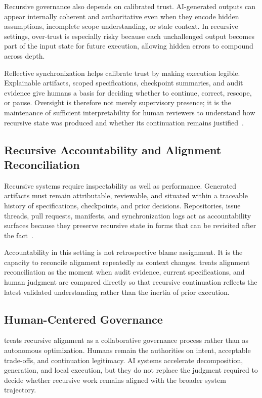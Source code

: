 Recursive governance also depends on calibrated trust. AI-generated outputs can appear internally coherent and authoritative even when they encode hidden assumptions, incomplete scope understanding, or stale context. In recursive settings, over-trust is especially risky because each unchallenged output becomes part of the input state for future execution, allowing hidden errors to compound across depth.

Reflective synchronization helps calibrate trust by making execution legible. Explainable artifacts, scoped specifications, checkpoint summaries, and audit evidence give humans a basis for deciding whether to continue, correct, rescope, or pause. Oversight is therefore not merely supervisory presence; it is the maintenance of sufficient interpretability for human reviewers to understand how recursive state was produced and whether its continuation remains justified~\cite{Amershi2014InteractiveML,Shneiderman2020HCAI}.

\subsection{Recursive Accountability and Alignment Reconciliation}

Recursive systems require inspectability as well as performance. Generated artifacts must remain attributable, reviewable, and situated within a traceable history of specifications, checkpoints, and prior decisions. Repositories, issue threads, pull requests, manifests, and synchronization logs act as accountability surfaces because they preserve recursive state in forms that can be revisited after the fact~\cite{Lamport1978TimeClocks,Chandy1985DistributedSnapshots,Hutchins1995CognitionWild}.

Accountability in this setting is not retrospective blame assignment. It is the capacity to reconcile alignment repeatedly as context changes.  treats alignment reconciliation as the moment when audit evidence, current specifications, and human judgment are compared directly so that recursive continuation reflects the latest validated understanding rather than the inertia of prior execution.

\subsection{Human-Centered Governance}

 treats recursive alignment as a collaborative governance process rather than as autonomous optimization. Humans remain the authorities on intent, acceptable trade-offs, and continuation legitimacy. AI systems accelerate decomposition, generation, and local execution, but they do not replace the judgment required to decide whether recursive work remains aligned with the broader system trajectory.

